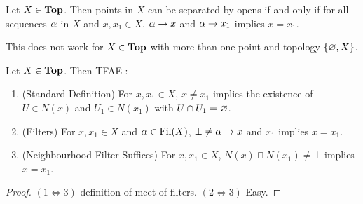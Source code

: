 \documentclass[main.tex]{subfiles}
\begin{document}
  
\begin{rmk}
  
  Let $X \in \mathbf{Top}$. Then 
  points in $X$ can be separated by opens if and only if 
  for all sequences $\alpha$ in $X$ and $x, x_1 \in X$,
  $\alpha \to x$ and $\alpha \to x_1$ implies $x = x_1$.

  This does not work for $X \in \mathbf{Top}$ with more than one point and 
  topology $\left\{\varnothing, X\right\}$. 
\end{rmk}

\begin{prop}
  
  Let $X \in \mathbf{Top}$.
  Then TFAE : 
  \begin{enumerate}
    \item (Standard Definition) For $x, x_1 \in X$,
    $x \neq x_1$ implies the existence of $U \in N(x)$ and $U_1 \in N(x_1)$
    with $U \cap U_1 = \varnothing$.
    \item (Filters) For $x, x_1 \in X$ and $\alpha \in \operatorname{Fil}(X)$,
    $\bot \neq \alpha \to x$ and $x_1$ implies $x = x_1$.
    \item (Neighbourhood Filter Suffices)
    For $x, x_1 \in X$, 
    $N(x) \sqcap N(x_1) \neq \bot$ implies $x = x_1$.
  \end{enumerate}
\end{prop}
\begin{proof}
  $(1 \iff 3)$ definition of meet of filters.
  $(2 \iff 3)$ Easy. 
\end{proof}
\end{document}
